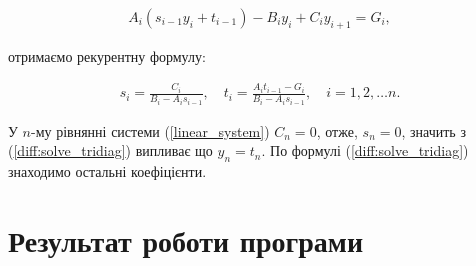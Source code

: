 \begin{equation}
\begin{multlined} 
A_i\left(s_{i-1}y_i + t_{i-1}\right) - B_i y_i + C_iy_{i+1} = G_i,
\end{multlined}
\end{equation}

отримаємо рекурентну формулу:

\begin{equation}
\begin{multlined} 
s_i = \frac{C_i}{B_i-A_is_{i-1}}, \quad t_i = \frac{A_it_{i-1}-G_i}{B_i-A_is_{i-1}}, \quad i = 1, 2, \dots n.
\end{multlined}
\end{equation}

У \(n\)-му рівнянні системи (\ref{linear_system}) \(C_n = 0\), отже, \(s_n = 0\), значить з (\ref{diff:solve_tridiag}) випливає що \(y_n = t_n\). По формулі (\ref{diff:solve_tridiag}) знаходимо остальні коефіцієнти.


\section{Результат роботи програми}


